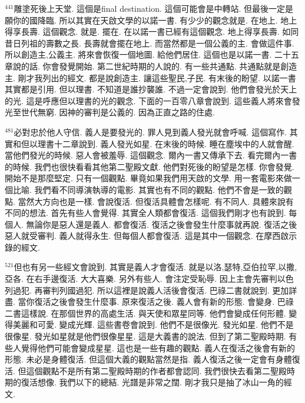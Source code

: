 \documentclass{book}
\begin{document}
$^{441}$雕塗死後上天堂.
這個是final destination.
這個可能會是中轉站.
但最後一定是願你的國降臨.
所以其實在天啟文學的以諾一書.
有少少的觀念就是.
在地上.
地上得享長壽.
這個觀念.
就是.
擺在.
在以諾一書已經有這個觀念.
地上得享長壽.
如同昔日列祖的壽數之長.
長壽就會擺在地上.
而當然都是一個公義的主.
會做這件事.
所以創造主,公義主.
將來會恢復一個地圖.
給他們居住.
這個也是以諾一書.
二十五章說的話.
你會發覺開始.
第二世紀時期的人說的.
有一些共通點.
共通點就是創造主.
剛才我列出的經文.
都是說創造主.
讓這些聖民,子民.
有末後的盼望.
以諾一書其實都是引用.
但以理書.
不知道是誰抄襲誰.
不過一定會說到.
他們會發光於天上的光.
這是呼應但以理書的光的觀念.
下面的一百零八章會說到.
這些義人將來會發光至世代無窮.
因神的審判是公義的.
因為正直之路的住處.

$^{481}$必對忠於他人守信.
義人是要發光的.
罪人見到義人發光就會呼喊.
這個寫作.
其實和但以理書十二章說到.
義人發光如星.
在末後的時候.
睡在塵埃中的人就會醒.
當他們發光的時候.
惡人會被羞辱.
這個觀念.
爾內一書又傳承下去.
看完爾內一書的時候.
我們也很快看看其他第二聖殿文獻.
他們對死後的盼望是怎樣.
你會發覺.
開始不是那麼堅定.
只有一個觀點.
畢竟如果我們用天啟的文學.
用一套電影來做一個比喻.
我們看不同導演執導的電影.
其實也有不同的觀點.
他們不會是一致的觀點.
當然大方向也是一樣.
會說復活.
但復活具體會怎樣呢.
有不同人.
具體來說有不同的想法.
首先有些人會覺得.
其實全人類都會復活.
這個我們剛才也有說到.
每個人.
無論你是惡人還是義人.
都會復活.
復活之後會發生什麼事就再說.
復活之後惡人就受審判.
義人就得永生.
但每個人都會復活.
這是其中一個觀念.
在摩西啟示錄的經文.

$^{521}$但也有另一些經文會說到.
其實是義人才會復活.
就是以洛,瑟特,亞伯拉罕,以撒,亞各.
在右手邊復活.
大大喜樂.
另外有些人.
會注定受恥辱.
因上主會先審判以色列過犯.
再審判列國過犯.
所以這裡是說義人活後會復活.
巴祿二書就說到.
更加詳盡.
當你復活之後會發生什麼事.
原來復活之後.
義人會有新的形態.
會變身.
巴祿二書這樣說.
在那個世界的高處生活.
與天使和眾星同等.
他們會變成任何形體.
變得美麗和可愛.
變成光輝.
這些書卷會說到.
他們不是很像光.
發光如星.
他們不是很像星.
發光如星就是他們很像星星.
這是大義書的說法.
但到了第二聖殿時期.
有些人覺得他們可能會變成星星.
這也是一些有趣的觀點.
義人在復活之後會有新的形態.
未必是身體復活.
但這個大義的觀點當然是指.
義人復活之後一定會有身體復活.
但這個觀點不是所有第二聖殿時期的作者都會認同.
我們很快去看第二聖殿時期的復活想像.
我們以下的總結.
光譜是非常之闊.
剛才我只是抽了冰山一角的經文.
\end{document}
